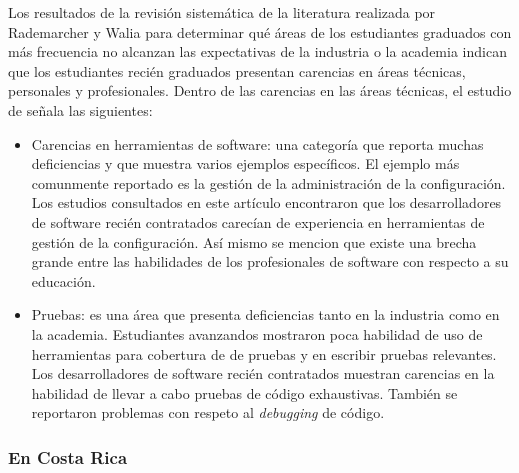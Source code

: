 \documentclass[journal]{IEEEtran}
\begin{document}
Los resultados de la revisión sistemática de la literatura realizada por Rademarcher y Walia \cite{radermacher-walia} para determinar qué áreas de los estudiantes graduados con más frecuencia no alcanzan las expectativas de la industria o la academia indican que los estudiantes recién graduados presentan carencias en áreas técnicas, personales y profesionales. Dentro de las carencias en las áreas técnicas, el estudio de \cite{radermacher-walia} señala las siguientes:
\begin{itemize}
    \item Carencias en herramientas de software: una categoría que reporta muchas deficiencias y que muestra varios ejemplos específicos. El ejemplo más comunmente reportado es la gestión de la administración de la configuración. Los estudios consultados en este artículo encontraron que los desarrolladores de software recién contratados carecían de experiencia en herramientas de gestión de la configuración. Así mismo se mencion que existe una brecha grande entre las habilidades de los profesionales de software con respecto a su educación.
    \item Pruebas: es una área que presenta deficiencias tanto en la industria como en la academia. Estudiantes avanzandos mostraron poca habilidad de uso de herramientas para cobertura de de pruebas y en escribir pruebas relevantes. Los desarrolladores de software recién contratados muestran carencias en la habilidad de llevar a cabo pruebas de código exhaustivas. También se reportaron problemas con respeto al \emph{debugging} de código.
\end{itemize}


\subsubsection{En Costa Rica}



%
%
\end{document}
